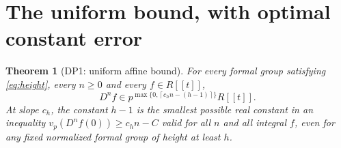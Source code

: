 \documentclass[11pt,a4paper]{article}
\newtheorem{theorem}{Theorem}[section]
\theoremstyle{definition}\newtheorem{remark}[theorem]{Remark}
\newcommand{\vp}{v_p}\newcommand{\dR}{\mathrm{dR}}\newcommand{\crys}{\mathrm{crys}}
\newcommand{\ceil}[1]{\left\lceil #1\right\rceil}\newcommand{\floor}[1]{\left\lfloor #1\right\rfloor}
\begin{document}
\section{The uniform bound, with optimal constant error}

\begin{theorem}[DP1: uniform affine bound]\label{DP1}
For every formal group satisfying \eqref{eq:height}, every $n\ge0$ and every $f\in R[[t]]$,
\begin{equation}\label{eq:affine}
 D^n f\in p^{\max\{0,\ceil{c_hn-(h-1)}\}}R[[t]].
\end{equation}
At slope $c_h$, the constant $h-1$ is the smallest possible real constant in an inequality $\vp(D^nf(0))\ge c_hn-C$ valid for all $n$ and all integral $f$, even for any fixed normalized formal group of height at least $h$.
\end{theorem}
\end{document}
